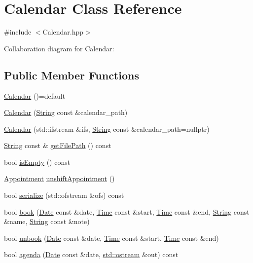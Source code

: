 \hypertarget{classCalendar}{}\section{Calendar Class Reference}
\label{classCalendar}


{\ttfamily \#include $<$Calendar.\+hpp$>$}



Collaboration diagram for Calendar\+:
\subsection*{Public Member Functions}
\begin{DoxyCompactItemize}
\item 
\hyperlink{classCalendar_a568f7ef431263d9667286aebac96febf}{Calendar} ()=default
\item 
\hyperlink{classCalendar_a54d7e31f38979ee7a363594b86ca9419}{Calendar} (\hyperlink{classString}{String} const \&calendar\+\_\+path)
\item 
\hyperlink{classCalendar_a346673cf7dd15ffa3a2ea292703c5421}{Calendar} (std\+::ifstream \&ifs, \hyperlink{classString}{String} const \&calendar\+\_\+path=nullptr)
\item 
\hyperlink{classString}{String} const  \& \hyperlink{classCalendar_afb5265ef3f8b820048d35dc9921d6789}{get\+File\+Path} () const
\item 
bool \hyperlink{classCalendar_a304110c0454b23f75902ddcddbe8a921}{is\+Empty} () const
\item 
\hyperlink{classAppointment}{Appointment} \hyperlink{classCalendar_a6c94f89713fac92f1544ea3f1b9a8fc9}{unshift\+Appointment} ()
\item 
bool \hyperlink{classCalendar_abd08c73fde62b83cb12afe01ff574223}{serialize} (std\+::ofstream \&ofs) const
\item 
bool \hyperlink{classCalendar_ac50220dec77b2c19f09516ea88e9398c}{book} (\hyperlink{classDate}{Date} const \&date, \hyperlink{classTime}{Time} const \&start, \hyperlink{classTime}{Time} const \&end, \hyperlink{classString}{String} const \&name, \hyperlink{classString}{String} const \&note)
\item 
bool \hyperlink{classCalendar_a24540f159572a53109a20be9ea8f4c5e}{unbook} (\hyperlink{classDate}{Date} const \&date, \hyperlink{classTime}{Time} const \&start, \hyperlink{classTime}{Time} const \&end)
\item 
bool \hyperlink{classCalendar_ac6112aa4e9b3e6e5b9a478ff66789d77}{agenda} (\hyperlink{classDate}{Date} const \&date, \hyperlink{doctest_8h_a116af65cb5e924b33ad9d9ecd7a783f3}{std\+::ostream} \&out) const

\end{DoxyCompactItemize}
